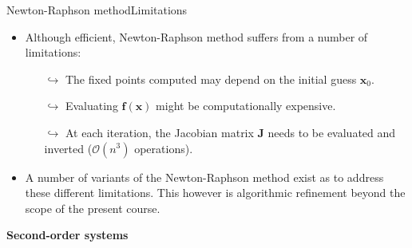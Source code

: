 \documentclass[usenames,dvipsnames,svgnames,10pt,aspectratio=169]{beamer}
\begin{document}
\begin{frame}[t, c]{Newton-Raphson method}{Limitations}
	\begin{itemize}
		\item Although efficient, Newton-Raphson method suffers from a number of limitations:
		\begin{itemize}
			\item[$\hookrightarrow$] The fixed points computed may depend on the initial guess ${\bm x}_0$.
			\item[$\hookrightarrow$] Evaluating ${\bm f}({\bm x})$ might be computationally expensive.
			\item[$\hookrightarrow$] At each iteration, the Jacobian matrix ${\bm J}$ needs to be evaluated and inverted ($\mathcal{O}(n^3)$ operations).
		\end{itemize}

		\bigskip

		\item A number of variants of the Newton-Raphson method exist as to address these different limitations. This however is algorithmic refinement beyond the scope of the present course.
	\end{itemize}

	\vspace{1cm}
\end{frame}


\begin{frame}[t, c]{}
	\centering
	\vspace{1cm}

	{\Large \textbf{Second-order systems}}

	\bigskip

	{}

\end{frame}

\begin{frame}[t, c]{}{}

\end{frame}
\end{document}
